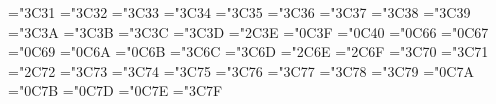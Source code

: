 \mathchardef\nVdash="3C31
\mathchardef\nvDash="3C32
\mathchardef\nVDash="3C33
\mathchardef\ntrianglerighteq="3C34
\mathchardef\ntrianglelefteq="3C35
\mathchardef\ntriangleleft="3C36
\mathchardef\ntriangleright="3C37
\mathchardef\nleftarrow="3C38
\mathchardef\nrightarrow="3C39
\mathchardef\nLeftarrow="3C3A
\mathchardef\nRightarrow="3C3B
\mathchardef\nLeftrightarrow="3C3C
\mathchardef\nleftrightarrow="3C3D
\mathchardef\divideontimes="2C3E
\mathchardef\varnothing="0C3F
\mathchardef\nexists="0C40
\mathchardef\mho="0C66
\mathchardef\thorn="0C67
\mathchardef\beth="0C69
\mathchardef\gimel="0C6A
\mathchardef\daleth="0C6B
\mathchardef\lessdot="3C6C
\mathchardef\gtrdot="3C6D
\mathchardef\ltimes="2C6E
\mathchardef\rtimes="2C6F
\mathchardef\shortmid="3C70
\mathchardef\shortparallel="3C71
\mathchardef\smallsetminus="2C72
\mathchardef\thicksim="3C73
\mathchardef\thickapprox="3C74
\mathchardef\approxeq="3C75
\mathchardef\succapprox="3C76
\mathchardef\precapprox="3C77
\mathchardef\curvearrowleft="3C78
\mathchardef\curvearrowright="3C79
\mathchardef\digamma="0C7A
\mathchardef\varkappa="0C7B
\mathchardef\hslash="0C7D
\mathchardef\hbar="0C7E
\mathchardef\backepsilon="3C7F


\def\Bbb{\ifmmode\let\next\Bbb@\else
 \def\next{\@warning{Use \string\Bbb\space only in math mode}}\fi\next}
\def\Bbb@{\fam\ymfam}

%
%
%
%
%
%

